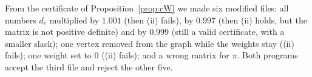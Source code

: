 From the certificate of Proposition~\ref{prop:cW} we made six modified files: all numbers $d_e$ multiplied by $1.001$ (then (ii) fails), by $0.997$ (then (ii) holds, but the matrix is not positive definite) and by $0.999$ (still a valid certificate, with a smaller slack); one vertex removed from the graph while the weights stay ((ii) fails); one weight set to $0$ ((ii) fails); and a wrong matrix for $\pi$. Both programs accept the third file and reject the other five.
